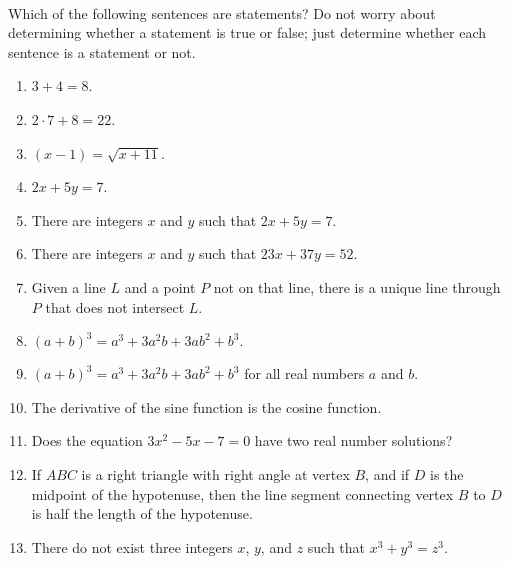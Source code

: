 \begin{prog} \label{prog:statements2} \hfill \\
Which of the following sentences are statements?  Do not worry about determining whether a statement is true or false; just determine whether each sentence is a statement or not.

\begin{multicols}{2}
\begin{enumerate}
\item $3 + 4 = 8$.

\item $2 \cdot 7 + 8 = 22$.

\item	$\left( {x - 1} \right) = \sqrt {x + 11}$.

\item $2x + 5y = 7$.\label{PA:prop3}
\end{enumerate}
\end{multicols}
\begin{enumerate} \setcounter{enumi}{4}
\item There are integers  $x$  and  $y$  such that $2x + 5y = 7.$\label{PA:prop4}

\item There are integers  $x$  and  $y$  such that $23x + 37y = 52.$


\item Given a line  $L$  and a point  $P$  not on that line, there is a unique line through  $P$  that does not intersect  $L$.

\item $\left( {a + b} \right)^3  = a^3 + 3a^2b + 3ab^2  + b^3.$\label{PA:prop8}

\item $\left( {a + b} \right)^3  = a^3  + 3a^2b + 3ab^2 + b^3$ for all real numbers  $a$  and  $b$.
\label{PA:prop9}

\item The derivative of the sine function is the cosine function.  %

\item Does the equation $3x^2 - 5x - 7 = 0$ have two real number solutions?

\item If $ABC$ is a right triangle with right angle at vertex $B$, and if $D$ is the midpoint of the hypotenuse, then the line segment connecting vertex $B$ to $D$ is half the length of the hypotenuse.


\item There do not exist three integers  $x$, $y$, and  $z$ such that 
 $x^3  + y^3  = z^3.$
\end{enumerate}
\end{prog}
\hbreak

\endinput
